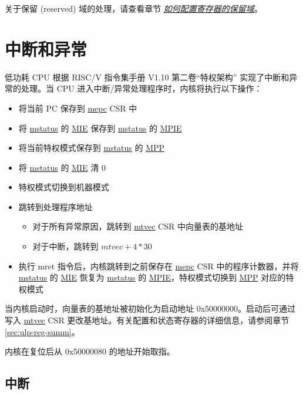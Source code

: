 \documentclass[main\_\_CN.tex]{subfiles}
\begin{document}
关于保留 (reserved) 域的处理，请查看章节 \hyperref[programming-reserved-field]{\textit{如何配置寄存器的保留域}}。




\section{中断和异常}

低功耗 CPU 根据 RISC\-/V 指令集手册 V1.10 第二卷“特权架构” 实现了中断和异常的处理。当 CPU 进入中断/异常处理程序时，内核将执行以下操作：
\begin{itemize}
    \item 将当前 PC 保存到 \hyperref[regdesc:LPMEPC]{mepc} CSR 中
    \item 将 \hyperref[regdesc:LPMSTATUS]{mstatus} 的 \hyperref[fielddesc:LPMSTATUSMIE]{MIE} 保存到 \hyperref[regdesc:LPMSTATUS]{mstatus} 的 \hyperref[fielddesc:LPMSTATUSMPIE]{MPIE}
    \item 将当前特权模式保存到 \hyperref[regdesc:LPMSTATUS]{mstatus} 的 \hyperref[fielddesc:LPMSTATUSMPP]{MPP}
    \item 将 \hyperref[regdesc:LPMSTATUS]{mstatus} 的 \hyperref[fielddesc:LPMSTATUSMIE]{MIE}  清 0
    \item 特权模式切换到机器模式
    \item 跳转到处理程序地址
        \begin{itemize}
            \item 对于所有异常原因，跳转到 \hyperref[regdesc:LPMTVEC]{mtvec} CSR 中向量表的基地址
            \item 对于中断，跳转到 $mtvec + 4*30$
        \end{itemize}
    \item 执行 mret 指令后，内核跳转到之前保存在 \hyperref[regdesc:LPMEPC]{mepc} CSR 中的程序计数器，并将 \hyperref[regdesc:LPMSTATUS]{mstatus} 的 \hyperref[fielddesc:LPMSTATUSMIE]{MIE} 恢复为 \hyperref[regdesc:LPMSTATUS]{mstatus} 的 \hyperref[fielddesc:LPMSTATUSMPIE]{MPIE}，特权模式切换到 \hyperref[fielddesc:LPMSTATUSMPP]{MPP} 对应的特权模式
\end{itemize}


当内核启动时，向量表的基地址被初始化为启动地址 0x50000000。启动后可通过写入 \hyperref[regdesc:LPMTVEC]{mtvec} CSR 更改基地址。有关配置和状态寄存器的详细信息，请参阅章节 \ref{sec:ulp-reg-summ}。

内核在复位后从 0x50000080 的地址开始取指。

\subsection{中断}\label{sec:ulp-intr}
\end{document}
